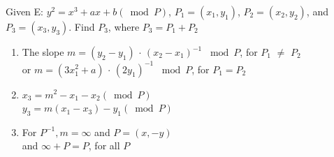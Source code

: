 \begin{corollary}
Given E: $y^2 = x^3 + ax + b (\bmod P)$, $P_1 = (x_1, y_1)$, $P_2 = (x_2, y_2)$, and $P_3 = (x_3, y_3)$. Find $P_3$, where $ P_3 =  P_1 + P_2$
\end{corollary}
\begin{enumerate}[(1)] 
	\item The slope $m =(y_2 - y_1)$ $\cdot$ $(x_2- x_1)^{-1}$ $\bmod P$, for $P_1$ $\neq$ $P_2$ \\
		\text{ \qquad \: \:} or $m =(3x^2_1 + a)$ $\cdot$ $(2y_1)^{-1}$ $\bmod P$, for $P_1 = P_2$ 
	\item $x_3 = m^2 - x_1 - x_2 (\bmod P)$ \\
		$y_3 = m(x_1 - x_3) - y_1 (\bmod P)$
	\item For $P^{-1}, m = \infty$ and $P = (x, -y)$ \\
		and $\infty + P = P$, for all $P$
\end {enumerate} 


